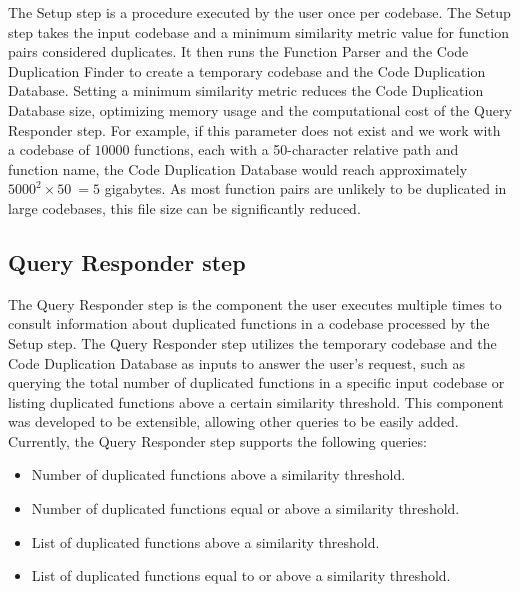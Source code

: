 The Setup step is a procedure executed by the user once per codebase. The Setup step takes the input codebase and a minimum similarity metric value for function pairs considered duplicates. It then runs the Function Parser and the Code Duplication Finder to create a temporary codebase and the Code Duplication Database. Setting a minimum similarity metric reduces the Code Duplication Database size, optimizing memory usage and the computational cost of the Query Responder step. For example, if this parameter does not exist and we work with a codebase of $10000$ functions, each with a 50-character relative path and function name, the Code Duplication Database would reach approximately $5000^2 \times 50 ~= 5$ gigabytes. As most function pairs are unlikely to be duplicated in large codebases, this file size can be significantly reduced.

\subsection{Query Responder step}

The Query Responder step is the component the user executes multiple times to consult information about duplicated functions in a codebase processed by the Setup step. The Query Responder step utilizes the temporary codebase and the Code Duplication Database as inputs to answer the user's request, such as querying the total number of duplicated functions in a specific input codebase or listing duplicated functions above a certain similarity threshold. This component was developed to be extensible, allowing other queries to be easily added. Currently, the Query Responder step supports the following queries:

\begin{itemize}
	\item Number of duplicated functions above a similarity threshold.
	\item Number of duplicated functions equal or above a similarity threshold.
	\item List of duplicated functions above a similarity threshold.
	\item List of duplicated functions equal to or above a similarity threshold.
\end{itemize}
